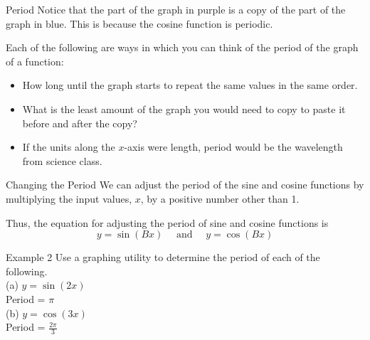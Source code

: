 \documentclass[t,usenames,dvipsnames]{beamer}
\begin{document}
\begin{frame}{Period}
Notice that the part of the graph in purple is a copy of the part of the graph in blue. This is because the cosine function is \alert{periodic}.   \newline\\   \pause

Each of the following are ways in which you can think of the period of the graph of a function:   \pause  \newline\\
\begin{itemize}
    \item How long until the graph starts to repeat the same values in the same order.  \pause  \newline\\
    \item What is the least amount of the graph you would need to copy to paste it before and after the copy?   \pause  \newline\\
    \item If the units along the $x$-axis were length, period would be the wavelength from science class.
\end{itemize}
\end{frame}

\begin{frame}{Changing the Period}
We can adjust the period of the sine and cosine functions by multiplying the input values, $x$, by a positive number other than 1. \newline\\    \pause

Thus, the equation for adjusting the period of sine and cosine functions is
\[
y = \sin (Bx) \quad \text{ and } \quad y = \cos (Bx)
\]
\end{frame}

\begin{frame}{Example 2}
Use a graphing utility to determine the period of each of the following.   \newline\\  
(a) \quad $y = \sin(2x)$    \newline\\ \pause
Period = $\pi$    \vspace{12pt}  \newline\\ \pause
(b) \quad $y = \cos(3x)$    \newline\\ \pause
Period = $\frac{2\pi}{3}$
\end{frame}
\end{document}
